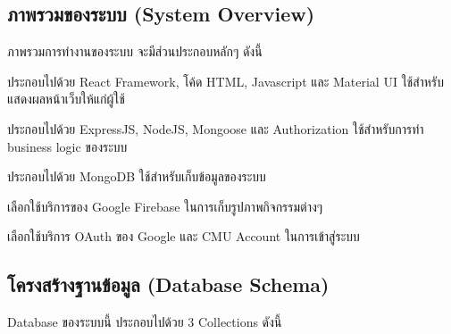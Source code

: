 \subsection{ภาพรวมของระบบ (System Overview)}
ภาพรวมการทำงานของระบบ จะมีส่วนประกอบหลักๆ ดังนี้

ประกอบไปด้วย React Framework, โค้ด HTML, Javascript และ Material UI ใช้สำหรับแสดงผลหน้าเว็บให้แก่ผู้ใช้

ประกอบไปด้วย ExpressJS, NodeJS, Mongoose และ Authorization ใช้สำหรับการทำ business logic ของระบบ

ประกอบไปด้วย MongoDB ใช้สำหรับเก็บข้อมูลของระบบ

เลือกใช้บริการของ Google Firebase ในการเก็บรูปภาพกิจกรรมต่างๆ

เลือกใช้บริการ OAuth ของ Google และ CMU Account ในการเข้าสู่ระบบ

\subsection{โครงสร้างฐานข้อมูล (Database Schema)}
Database ของระบบนี้ ประกอบไปด้วย 3 Collections ดังนี้

